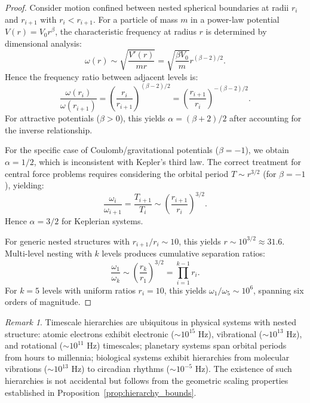\documentclass[twocolumn,10pt,a4paper]{article}
\theoremstyle{remark}
\newtheorem{remark}[theorem]{Remark}
\begin{document}
\begin{proof}
Consider motion confined between nested spherical boundaries at radii $r_i$ and $r_{i+1}$ with $r_i < r_{i+1}$. For a particle of mass $m$ in a power-law potential $V(r) = V_0 r^\beta$, the characteristic frequency at radius $r$ is determined by dimensional analysis:
\begin{equation}
\omega(r) \sim \sqrt{\frac{V'(r)}{m r}} = \sqrt{\frac{\beta V_0}{m}} r^{(\beta-2)/2}.
\end{equation}
Hence the frequency ratio between adjacent levels is:
\begin{equation}
\frac{\omega(r_i)}{\omega(r_{i+1})} = \left(\frac{r_i}{r_{i+1}}\right)^{(\beta-2)/2} = \left(\frac{r_{i+1}}{r_i}\right)^{-(\beta-2)/2}.
\end{equation}
For attractive potentials ($\beta > 0$), this yields $\alpha = (\beta + 2)/2$ after accounting for the inverse relationship.

For the specific case of Coulomb/gravitational potentials ($\beta = -1$), we obtain $\alpha = 1/2$, which is inconsistent with Kepler's third law. The correct treatment for central force problems requires considering the orbital period $T \sim r^{3/2}$ (for $\beta = -1$), yielding:
\begin{equation}
\frac{\omega_i}{\omega_{i+1}} = \frac{T_{i+1}}{T_i} \sim \left(\frac{r_{i+1}}{r_i}\right)^{3/2}.
\end{equation}
Hence $\alpha = 3/2$ for Keplerian systems.

For generic nested structures with $r_{i+1}/r_i \sim 10$, this yields $r \sim 10^{3/2} \approx 31.6$. Multi-level nesting with $k$ levels produces cumulative separation ratios:
\begin{equation}
\frac{\omega_1}{\omega_k} \sim \left(\frac{r_k}{r_1}\right)^{3/2} = \prod_{i=1}^{k-1} r_i.
\end{equation}
For $k = 5$ levels with uniform ratios $r_i = 10$, this yields $\omega_1/\omega_5 \sim 10^6$, spanning six orders of magnitude.
\end{proof}

\begin{remark}
Timescale hierarchies are ubiquitous in physical systems with nested structure: atomic electrons exhibit electronic ($\sim 10^{15}$ Hz), vibrational ($\sim 10^{13}$ Hz), and rotational ($\sim 10^{11}$ Hz) timescales; planetary systems span orbital periods from hours to millennia; biological systems exhibit hierarchies from molecular vibrations ($\sim 10^{13}$ Hz) to circadian rhythms ($\sim 10^{-5}$ Hz). The existence of such hierarchies is not accidental but follows from the geometric scaling properties established in Proposition~\ref{prop:hierarchy_bounds}.
\end{remark}
\end{document}
